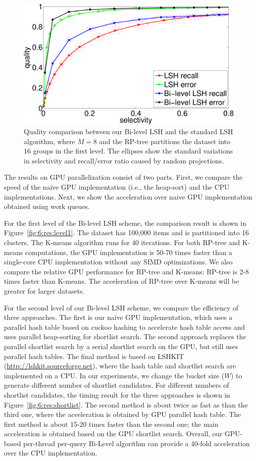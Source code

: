 \begin{figure}[t]
  \centering
  \includegraphics[width=0.8\linewidth]{figs/6/res/compare_L20_mh.pdf}
  \caption[Quality comparison between the Bi-level LSH and the standard LSH algorithm]{\label{fig:6:res:quality} Quality comparison between our Bi-level LSH and the standard LSH algorithm, where $M = 8$ and the RP-tree partitions the dataset into 16 groups in the first level. The ellipses show the standard variations in selectivity and recall/error ratio caused by random projections.}
\end{figure}

The results on GPU parallelization consist of two parts. First, we compare the speed of the naive GPU implementation (i.e., the heap-sort) and the CPU implementations. Next, we show the acceleration over naive GPU implementation obtained using work queues.

For the first level of the Bi-level LSH scheme, the comparison result is shown in Figure~\ref{fig:6:res:level1}. The dataset has 100,000 items and is partitioned into 16 clusters. The K-means algorithm runs for 40 iterations.
For both RP-tree and K-means computations, the GPU implementation is 50-70 times faster than a single-core CPU implementation without any SIMD optimizations. We also compare the relative GPU performance for RP-tree and K-means: RP-tree is 2-8 times faster than K-means. The acceleration of RP-tree over K-means will be greater for larger datasets.

For the second level of our Bi-level LSH scheme, we compare the efficiency of three approaches. The first is our naive GPU implementation, which uses a parallel hash table based on cuckoo hashing to accelerate hash table access and uses parallel heap-sorting for shortlist search. The second approach replaces the parallel shortlist search by a serial shortlist search on the GPU, but still uses parallel hash tables. The final method is based on LSHKIT (\url{http://lshkit.sourceforge.net}), where the hash table and shortlist search are implemented on a CPU. In our experiments, we change the bucket size ($W$) to generate different number of shortlist candidates. For different numbers of shortlist candidates, the timing result for the three approaches is shown in Figure~\ref{fig:6:res:shortlist}. The second method is about twice as fast as than the third one, where the acceleration is obtained by GPU parallel hash table. The first method is about 15-20 times faster than the second one; the main acceleration is obtained based on the GPU shortlist search. Overall, our GPU-based per-thread per-query Bi-Level algorithm can provide a 40-fold acceleration over the CPU implementation.

